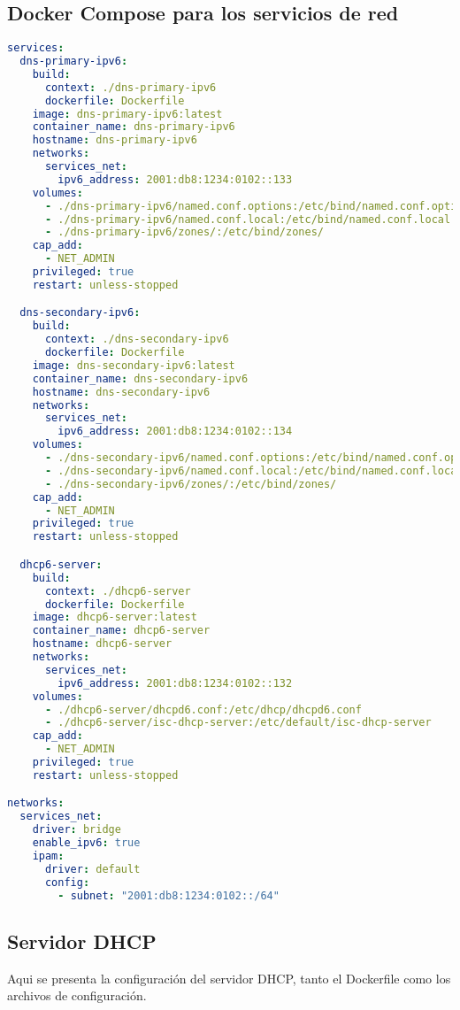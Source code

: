 \subsection{Docker Compose para los servicios de red}
\label{Apendice2:docker_compose}
\begin{lstlisting}[language=yaml]
  services:
  dns-primary-ipv6:
    build:
      context: ./dns-primary-ipv6
      dockerfile: Dockerfile
    image: dns-primary-ipv6:latest
    container_name: dns-primary-ipv6
    hostname: dns-primary-ipv6
    networks:
      services_net:
        ipv6_address: 2001:db8:1234:0102::133
    volumes:
      - ./dns-primary-ipv6/named.conf.options:/etc/bind/named.conf.options
      - ./dns-primary-ipv6/named.conf.local:/etc/bind/named.conf.local
      - ./dns-primary-ipv6/zones/:/etc/bind/zones/
    cap_add:
      - NET_ADMIN
    privileged: true
    restart: unless-stopped

  dns-secondary-ipv6:
    build:
      context: ./dns-secondary-ipv6
      dockerfile: Dockerfile
    image: dns-secondary-ipv6:latest
    container_name: dns-secondary-ipv6
    hostname: dns-secondary-ipv6
    networks:
      services_net:
        ipv6_address: 2001:db8:1234:0102::134
    volumes:
      - ./dns-secondary-ipv6/named.conf.options:/etc/bind/named.conf.options
      - ./dns-secondary-ipv6/named.conf.local:/etc/bind/named.conf.local
      - ./dns-secondary-ipv6/zones/:/etc/bind/zones/
    cap_add:
      - NET_ADMIN
    privileged: true
    restart: unless-stopped

  dhcp6-server:
    build:
      context: ./dhcp6-server
      dockerfile: Dockerfile
    image: dhcp6-server:latest
    container_name: dhcp6-server
    hostname: dhcp6-server
    networks:
      services_net:
        ipv6_address: 2001:db8:1234:0102::132
    volumes:
      - ./dhcp6-server/dhcpd6.conf:/etc/dhcp/dhcpd6.conf
      - ./dhcp6-server/isc-dhcp-server:/etc/default/isc-dhcp-server
    cap_add:
      - NET_ADMIN
    privileged: true
    restart: unless-stopped

networks:
  services_net:
    driver: bridge
    enable_ipv6: true
    ipam:
      driver: default
      config:
        - subnet: "2001:db8:1234:0102::/64"
\end{lstlisting}

\subsection{Servidor DHCP}
Aqui se presenta la configuración del servidor DHCP, tanto el Dockerfile como los archivos de configuración.

